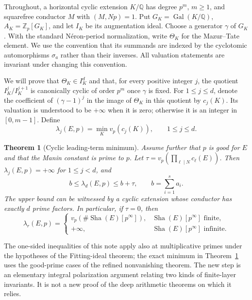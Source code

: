 \documentclass[11pt]{article}
\newtheorem{theorem}{Theorem}[section]
\theoremstyle{remark}\newtheorem{remark}[theorem]{Remark}
\newcommand{\Z}{\mathbb Z}\newcommand{\Q}{\mathbb Q}\newcommand{\F}{\mathbb F}
\newcommand{\Sha}{\operatorname{Sha}}
\newcommand{\Gal}{\operatorname{Gal}}
\begin{document}
Throughout, a horizontal cyclic extension $K/\Q$ has degree $p^m$, $m\geq1$, and squarefree conductor $M$ with $(M,Np)=1$. Put $G_K=\Gal(K/\Q)$, $A_K=\Z_p[G_K]$, and let $I_K$ be its augmentation ideal. Choose a generator $\gamma$ of $G_K$. With the standard N\'eron-period normalization, write $\Theta_K$ for the Mazur--Tate element. We use the convention that its summands are indexed by the cyclotomic automorphisms $\sigma_a$ rather than their inverses. All valuation statements are invariant under changing this convention.

We will prove that $\Theta_K\in I_K^d$ and that, for every positive integer $j$, the quotient $I_K^j/I_K^{j+1}$ is canonically cyclic of order $p^m$ once $\gamma$ is fixed. For $1\leq j\leq d$, denote the coefficient of $(\gamma-1)^j$ in the image of $\Theta_K$ in this quotient by $c_j(K)$. Its valuation is understood to be $+\infty$ when it is zero; otherwise it is an integer in $[0,m-1]$. Define
\begin{equation}
 \lambda_j(E,p)=\min_{K} v_p(c_j(K)),\qquad 1\leq j\leq d. \label{lambda}
\end{equation}

\begin{theorem}[Cyclic leading-term minimum]\label{main}
Assume further that $p$ is good for $E$ and that the Manin constant is prime to $p$. Let $\tau=v_p(\prod_{\ell\mid N}c_\ell(E))$. Then $\lambda_j(E,p)=+\infty$ for $1\leq j<d$, and
\begin{equation}
 b\leq\lambda_d(E,p)\leq b+\tau,
 \qquad b=\sum_{i=1}^s a_i. \label{sandwich}
\end{equation}
The upper bound can be witnessed by a cyclic extension whose conductor has exactly $d$ prime factors. In particular, if $\tau=0$, then
\begin{equation}
 \boxed{\displaystyle
 \lambda_r(E,p)=
 \begin{cases}
 v_p(\#\Sha(E)[p^\infty]),&\Sha(E)[p^\infty]\text{ finite},\\
 +\infty,&\Sha(E)[p^\infty]\text{ infinite}.
 \end{cases}}\label{mainformula}
\end{equation}
\end{theorem}

The one-sided inequalities of this note apply also at multiplicative primes under the hypotheses of the Fitting-ideal theorem; the exact minimum in Theorem~\ref{main} uses the good-prime cases of the refined nonvanishing theorem. The new step is an elementary integral polarization argument relating two kinds of finite-layer invariants. It is not a new proof of the deep arithmetic theorems on which it relies.
\end{document}
